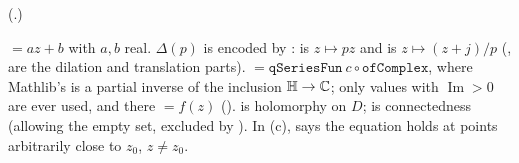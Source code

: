(.)
\begin{dictionary}
 $=az+b$ with $a,b$ real.  $\Delta(p)$ is encoded by :  is $z\mapsto pz$ and
 is $z\mapsto(z+j)/p$ (,  are the dilation and translation parts).
 $=\mathtt{qSeriesFun}\ c\circ\mathtt{ofComplex}$, where Mathlib's  is a
partial inverse of the inclusion $\mathbb{H}\to{\mathbb{C}}$; only values with $\operatorname{Im}>0$ are ever used, and there
 $=f(z)$ ().   is holomorphy on $D$;
 is connectedness (allowing the empty set, excluded by ).  In (c),
 says the equation holds at points arbitrarily close to $z_0$, $z\ne z_0$.
\end{dictionary}
